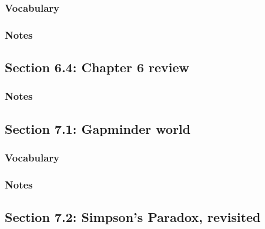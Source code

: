 \documentclass[
]{report}
\begin{document}
\hypertarget{vocabulary-7}{%
\subsubsection*{Vocabulary}\label{vocabulary-7}}

\hypertarget{notes-9}{%
\subsubsection*{Notes}\label{notes-9}}

\hypertarget{section-6.4-chapter-6-review}{%
\subsection*{Section 6.4: Chapter 6 review}\label{section-6.4-chapter-6-review}}

\hypertarget{notes-10}{%
\subsubsection*{Notes}\label{notes-10}}

\hypertarget{section-7.1-gapminder-world}{%
\subsection*{Section 7.1: Gapminder world}\label{section-7.1-gapminder-world}}

\hypertarget{vocabulary-8}{%
\subsubsection*{Vocabulary}\label{vocabulary-8}}

\hypertarget{notes-11}{%
\subsubsection*{Notes}\label{notes-11}}

\hypertarget{section-7.2-simpsons-paradox-revisited}{%
\subsection*{Section 7.2: Simpson's Paradox, revisited}\label{section-7.2-simpsons-paradox-revisited}}
\end{document}
